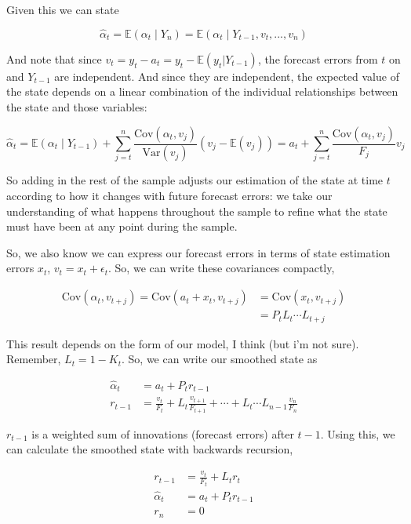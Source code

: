 \documentclass{tufte-book}
\begin{document}

\noindent Given this we can state

\[
\hat{\alpha}_t = \mathbb{E}(\alpha_t \mid Y_n) = \mathbb{E}(\alpha_t \mid Y_{t-1}, v_t, ..., v_n)
\]

\noindent And note that since $v_t = y_t - a_t = y_t - \mathbb{E}(y_t | Y_{t-1})$, the forecast errors from $t$ on and $Y_{t-1}$ are independent. And since they are independent, the expected value of the state depends on a linear combination of the individual relationships between the state and those variables:

\[
\hat{\alpha}_t = \mathbb{E}(\alpha_t \mid Y_{t-1}) + \sum_{j=t}^n \dfrac{\text{Cov}(\alpha_t, v_j)}{\text{Var}(v_j)} (v_j - \mathbb{E}(v_j)) = a_t + \sum_{j=t}^n \dfrac{\text{Cov}(\alpha_t, v_j)}{F_j} v_j
\]

So adding in the rest of the sample adjusts our estimation of the state at time $t$ according to how it changes with future forecast errors: we take our understanding of what happens throughout the sample to refine what the state must have been at any point during the sample.

So, we also know we can express our forecast errors in terms of state estimation errors $x_t$, $v_t = x_t + \epsilon_t$. So, we can write these covariances compactly,

\begin{align*}
\text{Cov}(\alpha_t, v_{t+j}) = \text{Cov}(a_t + x_t, v_{t+j}) &= \text{Cov}(x_t, v_{t+j}) \\
&= P_t L_t \cdots L_{t+j}
\end{align*}

This result depends on the form of our model, I think (but i'm not sure). Remember, $L_t = 1 - K_t$. So, we can write our smoothed state as

\begin{align*}
\hat{\alpha}_t &= a_t + P_t r_{t-1} \\
r_{t-1} &= \frac{v_t}{F_t} + L_t \frac{v_{t+1}}{F_{t+1}} + \cdots + L_t \cdots L_{n-1} \frac{v_n}{F_n}
\end{align*}

\noindent $r_{t-1}$ is a weighted sum of innovations (forecast errors) after $t-1$. Using this, we can calculate the smoothed state with backwards recursion,

\begin{align*}
r_{t-1} &= \frac{v_t}{F_t} + L_t r_t \\
\hat{\alpha}_t &= a_t + P_t r_{t-1} \\
r_n &= 0
\end{align*}
\end{document}
